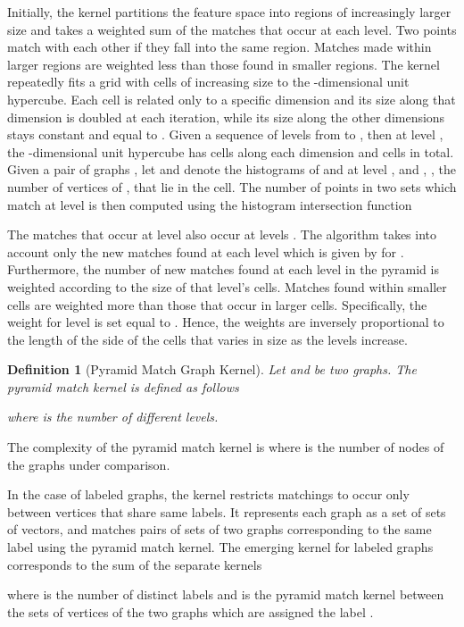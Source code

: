 \documentclass[twoside,11pt]{article}
\newtheorem{definition}{Definition}
\begin{document}
Initially, the kernel partitions the feature space into regions of increasingly larger size and takes a weighted sum of the matches that occur at each level.
Two points match with each other if they fall into the same region.
Matches made within larger regions are weighted less than those found in smaller regions.
The kernel repeatedly fits a grid with cells of increasing size to the -dimensional unit hypercube.
Each cell is related only to a specific dimension and its size along that dimension is doubled at each iteration, while its size along the other dimensions stays constant and equal to .
Given a sequence of levels from  to , then at level , the -dimensional unit hypercube has  cells along each dimension and  cells in total.
Given a pair of graphs , let  and  denote the histograms of  and  at level , and , , the number of vertices of ,  that lie in the  cell.
The number of points in two sets which match at level  is then computed using the histogram intersection function

The matches that occur at level  also occur at levels .
The algorithm takes into account only the new matches found at each level which is given by  for .
Furthermore, the number of new matches found at each level in the pyramid is weighted according to the size of that level's cells.
Matches found within smaller cells are weighted more than those that occur in larger cells.
Specifically, the weight for level  is set equal to .
Hence, the weights are inversely proportional to the length of the side of the cells that varies in size as the levels increase.

\begin{definition}[Pyramid Match Graph Kernel]
  Let  and  be two graphs.
	The pyramid match kernel is defined as follows
	
	where  is the number of different levels.
\end{definition}
The complexity of the pyramid match kernel is  where  is the number of nodes of the graphs under comparison.

In the case of labeled graphs, the kernel restricts matchings to occur only between vertices that share same labels.
It represents each graph as a set of sets of vectors, and matches pairs of sets of two graphs corresponding to the same label using the pyramid match kernel.
The emerging kernel for labeled graphs corresponds to the sum of the separate kernels

where  is the number of distinct labels and  is the pyramid match kernel between the sets of vertices of the two graphs which are assigned the label .
\end{document}
